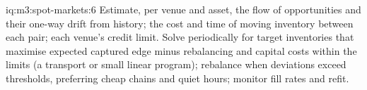 \begin{solution}{iq:m3:spot-markets:6}
Estimate, per venue and asset, the flow of opportunities and their one-way drift from history; the cost and time of
moving inventory between each pair; each venue's credit limit. Solve periodically for target inventories that
maximise expected captured edge minus rebalancing and capital costs within the limits (a transport or small linear
program); rebalance when deviations exceed thresholds, preferring cheap chains and quiet hours; monitor fill rates and
refit.
\end{solution}
